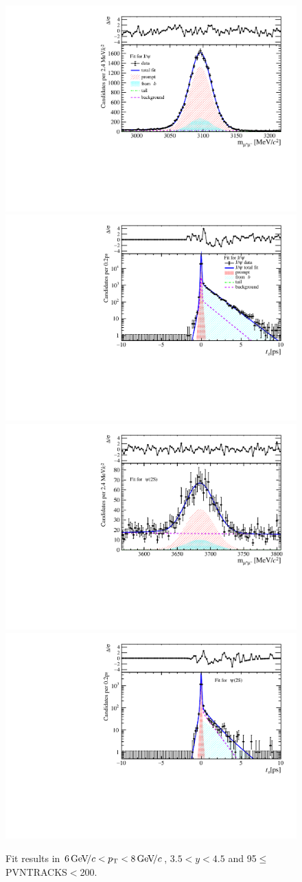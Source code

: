 \begin{figure}[H]
\begin{center}
\includegraphics[width=0.47\linewidth]{pdf/Jpsi/drawmass/n5y3pt4.pdf}
\includegraphics[width=0.47\linewidth]{pdf/Jpsi/2DFit/n5y3pt4.pdf}
\vspace*{-0.5cm}
\includegraphics[width=0.47\linewidth]{pdf/Psi2S/drawmass/n5y3pt4.pdf}
\includegraphics[width=0.47\linewidth]{pdf/Psi2S/2DFit/n5y3pt4.pdf}
\vspace*{-0.5cm}
\end{center}
\caption{Fit results in $6\text{\,Ge\kern -0.1em V\!/}c<p_{\mathrm{T}}<8\text{\,Ge\kern -0.1em V\!/}c$, $3.5<y<4.5$ and 95$\leq$PVNTRACKS$<$200.}
\label{Fitn5y3pt4}
\end{figure}
